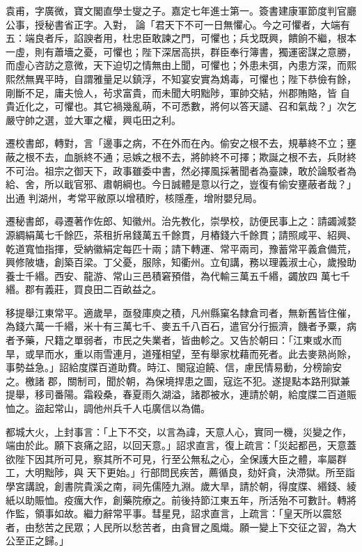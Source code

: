 \begin{pinyinscope}
 袁甫，字廣微，寶文閣直學士燮之子。嘉定七年進士第一。簽書建康軍節度判官廳公事，授秘書省正字。入對，
 論「君天下不可一日無懼心。今之可懼者，大端有五：端良者斥，諂諛者用，杜忠臣敢諫之門，可懼也；兵戈既興，饋餉不繼，根本一虛，則有蕭墻之憂，可懼也；陛下深居高拱，群臣奉行簿書，獨運密謀之意勝，而虛心咨訪之意微，天下迫切之情無由上聞，可懼也；外患未弭，內患方深，而熙熙然無異平時，自謂雅量足以鎮浮，不知宴安實為鴆毒，可懼也；陛下恭儉有餘，剛斷不足，庸夫憸人，茍求富貴，而未聞大明黜陟，軍帥交結，州郡賄賂，皆
 自貴近化之，可懼也。其它禍幾亂萌，不可悉數，將何以答天譴、召和氣哉？」次乞嚴守帥之選，並大軍之權，興屯田之利。



 遷校書郎，轉對，言「邊事之病，不在外而在內。偷安之根不去，規摹終不立；壅蔽之根不去，血脈終不通；忌嫉之根不去，將帥終不可擇；欺誕之根不去，兵財終不可治。祖宗之御天下，政事雖委中書，然必擇風採著聞者為臺諫，敢於論駁者為給、舍，所以戢官邪、肅朝綱也。今日誠體是意以行之，豈復有偷安壅蔽者哉？」出通
 判湖州，考常平敝原以增積貯，核隱產，增附嬰兒局。



 遷秘書郎，尋遷著作佐郎、知徽州。治先教化，崇學校，訪便民事上之：請蠲減婺源綢絹萬七千餘匹，茶租折帛錢萬五千餘貫，月樁錢六千餘貫；請照咸平、紹興、乾道寬恤指揮，受納徽絹定每匹十兩；請下轉運、常平兩司，豫蓄常平義倉備荒，興修陂塘，創築百梁。丁父憂，服除，知衢州。立旬講，務以理義淑士心，歲撥助養士千緡。西安、龍游、常山三邑積窘預借，為代輸三萬五千緡，蠲放四
 萬七千緡。郡有義莊，買良田二百畝益之。



 移提舉江東常平。適歲旱，亟發庫庾之積，凡州縣窠名隸倉司者，無新舊皆住催，為錢六萬一千緡，米十有三萬七千、麥五千八百石，遣官分行振濟，饑者予粟，病者予藥，尺籍之單弱者，市民之失業者，皆曲軫之。又告於朝曰：「江東或水而旱，或旱而水，重以雨雪連月，道殣相望，至有舉家枕藉而死者。此去麥熟尚賒，事勢益急。」詔給度牒百道助費。時江、閩寇迫饒、信，慮民情易動，分榜諭安之。檄諸
 郡，關制司，聞於朝，為保境捍患之圖，寇迄不犯。遂提點本路刑獄兼提舉，移司番陽。霜殺桑，春夏雨久湖溢，諸郡被水，連請於朝，給度牒二百道賑恤之。盜起常山，調他州兵千人屯廣信以為備。



 都城大火，上封事言：「上下不交，以言為諱，天意人心，實同一機，災變之作，端由於此。願下哀痛之詔，以回天意。」詔求直言，復上疏言：「災起都邑，天意蓋欲陛下因其所可見，察其所不可見，行至公無私之心，全保護大臣之體，率屬群工，大明黜陟，與
 天下更始。」行部問民疾苦，薦循良，劾奸貪，決滯獄。所至詣學宮講說，創書院貴溪之南，祠先儒陸九淵。歲大旱，請於朝，得度牒、緡錢、綾紙以助賑恤。疫癘大作，創藥院療之。前後持節江東五年，所活殆不可數計。轉將作監，領事如故。繼力辭常平事。彗星見，詔求直言，上疏言：「皇天所以震怒者，由愁苦之民眾；人民所以愁苦者，由貪冒之風熾。願一變上下交征之習，為大公至正之歸。」




\end{pinyinscope}
